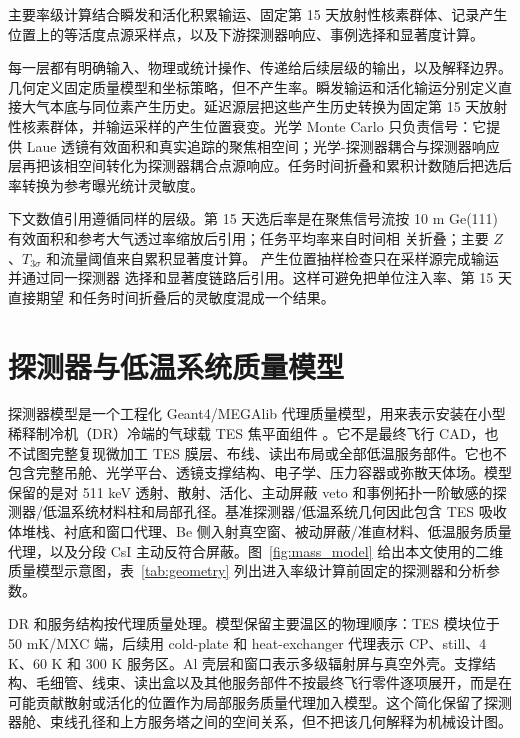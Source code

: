 \documentclass[preprint,12pt]{elsarticle}
\begin{document}
主要率级计算结合瞬发和活化积累输运、固定第 15 天放射性核素群体、记录产生位置上的等活度点源采样点，以及下游探测器响应、事例选择和显著度计算。

每一层都有明确输入、物理或统计操作、传递给后续层级的输出，以及解释边界。几何定义固定质量模型和坐标策略，但不产生率。瞬发输运和活化输运分别定义直接大气本底与同位素产生历史。延迟源层把这些产生历史转换为固定第 15 天放射性核素群体，并输运采样的产生位置衰变。光学 Monte Carlo 只负责信号：它提供 Laue 透镜有效面积和真实追踪的聚焦相空间；光学-探测器耦合与探测器响应层再把该相空间转化为探测器耦合点源响应。任务时间折叠和累积计数随后把选后率转换为参考曝光统计灵敏度。

下文数值引用遵循同样的层级。第 15 天选后率是在聚焦信号流按 10 m
Ge(111) 有效面积和参考大气透过率缩放后引用；任务平均率来自时间相
关折叠；主要 $Z$、$T_{3\sigma}$ 和流量阈值来自累积显著度计算。
产生位置抽样检查只在采样源完成输运并通过同一探测器
选择和显著度链路后引用。这样可避免把单位注入率、第 15 天直接期望
和任务时间折叠后的灵敏度混成一个结果。

\FloatBarrier

\section{探测器与低温系统质量模型}
\label{sec:geometry}

探测器模型是一个工程化 Geant4/MEGAlib 代理质量模型，用来表示安装在小型稀释制冷机（DR）冷端的气球载 TES 焦平面组件 \cite{Shirazi2023,Gottardi2021TESReview}。它不是最终飞行 CAD，也不试图完整复现微加工 TES 膜层、布线、读出布局或全部低温服务部件。它也不包含完整吊舱、光学平台、透镜支撑结构、电子学、压力容器或弥散天体场。模型保留的是对 511 keV 透射、散射、活化、主动屏蔽 veto 和事例拓扑一阶敏感的探测器/低温系统材料柱和局部孔径。基准探测器/低温系统几何因此包含 TES 吸收体堆栈、衬底和窗口代理、Be 侧入射真空窗、被动屏蔽/准直材料、低温服务质量代理，以及分段 CsI 主动反符合屏蔽。图~\ref{fig:mass_model} 给出本文使用的二维质量模型示意图，表~\ref{tab:geometry} 列出进入率级计算前固定的探测器和分析参数。

DR 和服务结构按代理质量处理。模型保留主要温区的物理顺序：TES 模块位于 50 mK/MXC 端，后续用 cold-plate 和 heat-exchanger 代理表示 CP、still、4 K、60 K 和 300 K 服务区。Al 壳层和窗口表示多级辐射屏与真空外壳。支撑结构、毛细管、线束、读出盒以及其他服务部件不按最终飞行零件逐项展开，而是在可能贡献散射或活化的位置作为局部服务质量代理加入模型。这个简化保留了探测器舱、束线孔径和上方服务塔之间的空间关系，但不把该几何解释为机械设计图。
\end{document}
